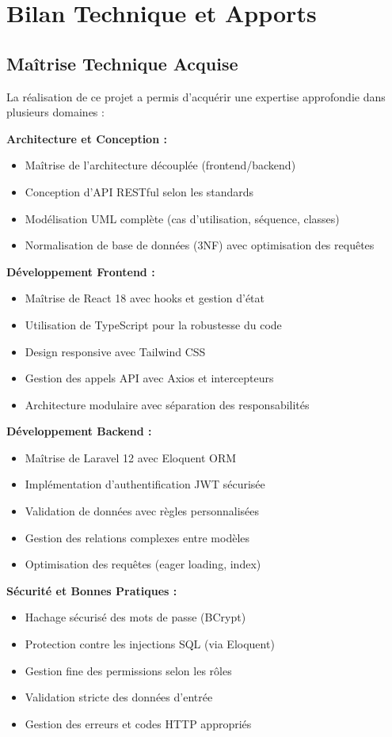 \documentclass[12pt,a4paper]{report}
\begin{document}
\section{Bilan Technique et Apports}

\subsection{Maîtrise Technique Acquise}

La réalisation de ce projet a permis d'acquérir une expertise approfondie dans plusieurs domaines :

\textbf{Architecture et Conception :}
\begin{itemize}
    \item Maîtrise de l'architecture découplée (frontend/backend)
    \item Conception d'API RESTful selon les standards
    \item Modélisation UML complète (cas d'utilisation, séquence, classes)
    \item Normalisation de base de données (3NF) avec optimisation des requêtes
\end{itemize}

\textbf{Développement Frontend :}
\begin{itemize}
    \item Maîtrise de React 18 avec hooks et gestion d'état
    \item Utilisation de TypeScript pour la robustesse du code
    \item Design responsive avec Tailwind CSS
    \item Gestion des appels API avec Axios et intercepteurs
    \item Architecture modulaire avec séparation des responsabilités
\end{itemize}

\textbf{Développement Backend :}
\begin{itemize}
    \item Maîtrise de Laravel 12 avec Eloquent ORM
    \item Implémentation d'authentification JWT sécurisée
    \item Validation de données avec règles personnalisées
    \item Gestion des relations complexes entre modèles
    \item Optimisation des requêtes (eager loading, index)
\end{itemize}

\textbf{Sécurité et Bonnes Pratiques :}
\begin{itemize}
    \item Hachage sécurisé des mots de passe (BCrypt)
    \item Protection contre les injections SQL (via Eloquent)
    \item Gestion fine des permissions selon les rôles
    \item Validation stricte des données d'entrée
    \item Gestion des erreurs et codes HTTP appropriés
\end{itemize}
\end{document}

